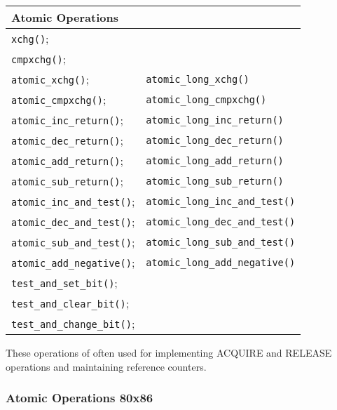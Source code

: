 \documentclass{article}
\begin{document}
\begin{center}
  \begin{tabular}{ l | l }    
    \hline
    Atomic Operations &  \\ \hline
    \lstinline{xchg()}; & \\
    \lstinline{cmpxchg()}; & \\
    \lstinline{atomic_xchg()}; &			\lstinline{atomic_long_xchg()} \\
    \lstinline{atomic_cmpxchg()}; &		        \lstinline{atomic_long_cmpxchg()} \\
    \lstinline{atomic_inc_return()}; &		        \lstinline{atomic_long_inc_return()} \\
    \lstinline{atomic_dec_return()}; &		        \lstinline{atomic_long_dec_return()} \\
    \lstinline{atomic_add_return()}; &		        \lstinline{atomic_long_add_return()} \\
    \lstinline{atomic_sub_return()}; &		        \lstinline{atomic_long_sub_return()} \\
    \lstinline{atomic_inc_and_test()}; &		\lstinline{atomic_long_inc_and_test()} \\
    \lstinline{atomic_dec_and_test()}; &		\lstinline{atomic_long_dec_and_test()} \\
    \lstinline{atomic_sub_and_test()}; &		\lstinline{atomic_long_sub_and_test()} \\
    \lstinline{atomic_add_negative()}; &		\lstinline{atomic_long_add_negative()} \\
    \lstinline{test_and_set_bit()}; & \\
    \lstinline{test_and_clear_bit()}; & \\
    \lstinline{test_and_change_bit()}; &     \\
    \hline
  \end{tabular}
\end{center}

These operations of often used for implementing ACQUIRE and RELEASE
operations and maintaining reference counters.


\subsubsection{Atomic Operations 80x86}
\end{document}
